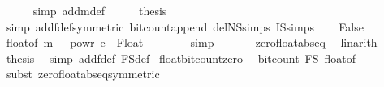 \begin{isabellebody}
\ \ \ \ \isamarkupfalse%
\ {\isacharparenleft}{\kern0pt}simp\ add{\isacharcolon}{\kern0pt}m{\isacharunderscore}{\kern0pt}def{\isacharparenright}{\kern0pt}\isanewline
\ \ \isamarkupfalse%
\ \isamarkupfalse%
\ {\isacharquery}{\kern0pt}thesis\ \isamarkupfalse%
\ {\isacharparenleft}{\kern0pt}simp\ add{\isacharcolon}{\kern0pt}f{\isacharunderscore}{\kern0pt}def{\isacharbrackleft}{\kern0pt}symmetric{\isacharbrackright}{\kern0pt}\ bit{\isacharunderscore}{\kern0pt}count{\isacharunderscore}{\kern0pt}append\ del{\isacharcolon}{\kern0pt}N\isactrlsub S{\isachardot}{\kern0pt}simps\ I\isactrlsub S{\isachardot}{\kern0pt}simps{\isacharparenright}{\kern0pt}\isanewline
{}\isamarkupfalse%
\isanewline
\ \ \isamarkupfalse%
\ False\isanewline
\ \ \isamarkupfalse%
\ {\isachardoublequoteopen}float{\isacharunderscore}{\kern0pt}of\ {\isacharparenleft}{\kern0pt}m\ {\isacharasterisk}{\kern0pt}\ {}\ powr\ e{\isacharparenright}{\kern0pt}\ {\isacharequal}{\kern0pt}\ Float\ {}\ {}{\isachardoublequoteclose}\isanewline
\ \ \ \ \isamarkupfalse%
\ simp\ \isanewline
\ \ \ \ \isamarkupfalse%
\ zero{\isacharunderscore}{\kern0pt}float{\isachardot}{\kern0pt}abs{\isacharunderscore}{\kern0pt}eq\ \isamarkupfalse%
\ linarith\isanewline
\ \ \isamarkupfalse%
\ \isamarkupfalse%
\ {\isacharquery}{\kern0pt}thesis\ \isamarkupfalse%
\ {\isacharparenleft}{\kern0pt}simp\ add{\isacharcolon}{\kern0pt}f{\isacharunderscore}{\kern0pt}def\ F\isactrlsub S{\isacharunderscore}{\kern0pt}def{\isacharparenright}{\kern0pt}\isanewline
{}\isamarkupfalse%
%
\endisatagproof
{\isafoldproof}%
%
\isadelimproof
\isanewline
%
\endisadelimproof
\isanewline
{}\isamarkupfalse%
\ float{\isacharunderscore}{\kern0pt}bit{\isacharunderscore}{\kern0pt}count{\isacharunderscore}{\kern0pt}zero{\isacharcolon}{\kern0pt}\isanewline
\ \ {\isachardoublequoteopen}bit{\isacharunderscore}{\kern0pt}count\ {\isacharparenleft}{\kern0pt}F\isactrlsub S\ {\isacharparenleft}{\kern0pt}float{\isacharunderscore}{\kern0pt}of\ {}{\isacharparenright}{\kern0pt}{\isacharparenright}{\kern0pt}\ {\isacharequal}{\kern0pt}\ {}{\isachardoublequoteclose}\isanewline
%
\isadelimproof
\ \ %
\endisadelimproof
%
\isatagproof
{}\isamarkupfalse%
\ {\isacharparenleft}{\kern0pt}subst\ zero{\isacharunderscore}{\kern0pt}float{\isachardot}{\kern0pt}abs{\isacharunderscore}{\kern0pt}eq{\isacharbrackleft}{\kern0pt}symmetric{\isacharbrackright}{\kern0pt}{\isacharparenright}{\kern0pt}\isanewline

\end{isabellebody}
